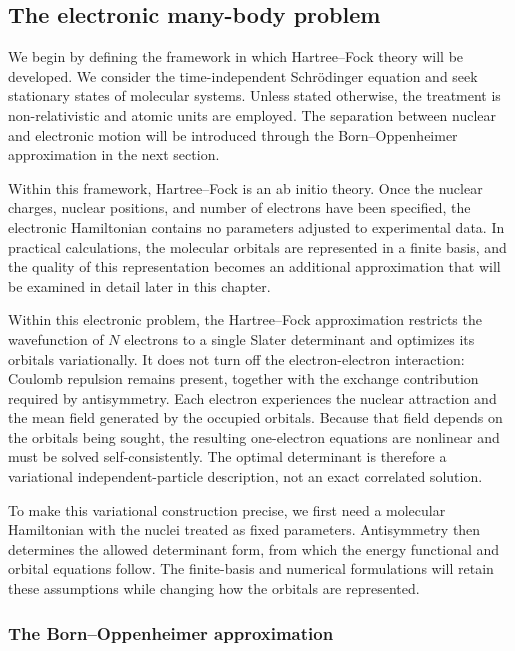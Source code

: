 \documentclass[11pt,a4paper,titlepage]{article}
\numberwithin{equation}{section}
\begin{document}
\hfBioSwirles

\subsection{The electronic many-body problem}

We begin by defining the framework in which Hartree--Fock theory will be
developed. We consider the time-independent Schr\"odinger equation and
seek stationary states of molecular systems. Unless stated otherwise, the
treatment is non-relativistic and atomic units are employed. The separation
between nuclear and electronic motion will be introduced through the
Born--Oppenheimer approximation in the next section.

Within this framework, Hartree--Fock is an ab initio theory. Once the
nuclear charges, nuclear positions, and number of electrons have been
specified, the electronic Hamiltonian contains no parameters adjusted to
experimental data. In practical calculations, the molecular orbitals are
represented in a finite basis, and the quality of this representation becomes
an additional approximation that will be examined in detail later in this
chapter.

Within this electronic problem, the Hartree--Fock approximation restricts the
wavefunction of $N$ electrons to a single Slater determinant and optimizes
its orbitals variationally. It does not turn off the electron-electron
interaction: Coulomb repulsion remains present, together with the exchange
contribution required by antisymmetry. Each electron experiences the nuclear
attraction and the mean field generated by the occupied orbitals. Because
that field depends on the orbitals being sought, the resulting one-electron
equations are nonlinear and must be solved self-consistently. The optimal
determinant is therefore a variational independent-particle description,
not an exact correlated solution.

To make this variational construction precise, we first need a molecular
Hamiltonian with the nuclei treated as fixed parameters. Antisymmetry then
determines the allowed determinant form, from which the energy functional
and orbital equations follow. The finite-basis and numerical formulations
will retain these assumptions while changing how the orbitals are represented.

\subsubsection{The Born--Oppenheimer approximation}
\end{document}
